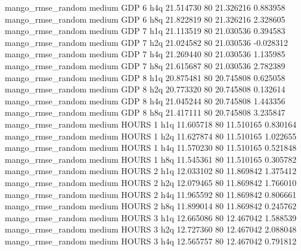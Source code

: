 mango_rmse_random     medium      GDP                 6                  h4q 21.514730 80      21.326216           0.883958
mango_rmse_random     medium      GDP                 6                  h8q 21.822819 80      21.326216           2.328605
mango_rmse_random     medium      GDP                 7                  h1q 21.113519 80      21.030536           0.394583
mango_rmse_random     medium      GDP                 7                  h2q 21.024582 80      21.030536          -0.028312
mango_rmse_random     medium      GDP                 7                  h4q 21.269440 80      21.030536           1.135985
mango_rmse_random     medium      GDP                 7                  h8q 21.615687 80      21.030536           2.782389
mango_rmse_random     medium      GDP                 8                  h1q 20.875481 80      20.745808           0.625058
mango_rmse_random     medium      GDP                 8                  h2q 20.773320 80      20.745808           0.132614
mango_rmse_random     medium      GDP                 8                  h4q 21.045244 80      20.745808           1.443356
mango_rmse_random     medium      GDP                 8                  h8q 21.417111 80      20.745808           3.235847
mango_rmse_random     medium    HOURS                 1                  h1q 11.605718 80      11.510165           0.830164
mango_rmse_random     medium    HOURS                 1                  h2q 11.627874 80      11.510165           1.022655
mango_rmse_random     medium    HOURS                 1                  h4q 11.570230 80      11.510165           0.521848
mango_rmse_random     medium    HOURS                 1                  h8q 11.545361 80      11.510165           0.305782
mango_rmse_random     medium    HOURS                 2                  h1q 12.033102 80      11.869842           1.375412
mango_rmse_random     medium    HOURS                 2                  h2q 12.079465 80      11.869842           1.766010
mango_rmse_random     medium    HOURS                 2                  h4q 11.965592 80      11.869842           0.806661
mango_rmse_random     medium    HOURS                 2                  h8q 11.899014 80      11.869842           0.245762
mango_rmse_random     medium    HOURS                 3                  h1q 12.665086 80      12.467042           1.588539
mango_rmse_random     medium    HOURS                 3                  h2q 12.727360 80      12.467042           2.088048
mango_rmse_random     medium    HOURS                 3                  h4q 12.565757 80      12.467042           0.791812
